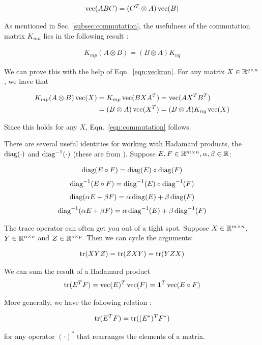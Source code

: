 \begin{align}
\operatorname{vec}(ABC) = (C^T \otimes A) \operatorname{vec}(B) \label{eqn:veckron}
\end{align}

As mentioned in Sec. \ref{subsec:commutation}, the usefulness of the commutation matrix $K_{mn}$ lies in the following result \cite{magnus1988matrix}:

\begin{align}
K_{mp} (A \otimes B) = (B \otimes A) K_{nq}  \label{eqn:commutation}
\end{align}

We can prove this with the help of Eqn.~\ref{eqn:veckron}. For any matrix $X \in \mathbb{R}^{q \times n}$, we have that

\begin{align*}
  K_{mp} (A \otimes B) \operatorname{vec}(X) &= K_{mp} \operatorname{vec}(B X A^T) = \operatorname{vec}(A X^T B^T) \\
                              &= (B \otimes A) \operatorname{vec}(X^T) = (B \otimes A) K_{nq}\operatorname{vec}(X)
\end{align*}

Since this holds for any $X$, Eqn.~\ref{eqn:commutation} follows. 

There are several useful identities for working with Hadamard products, the $\operatorname{diag}(\cdot)$ and $\operatorname{diag}^{-1}(\cdot)$ (these are from \cite{minka2000old}).  Suppose $E, F \in \mathbb{R}^{m \times n}, \alpha, \beta \in \mathbb{R}$:

\begin{align}
  \operatorname{diag}(E \circ F) = \operatorname{diag}(E) \circ \operatorname{diag} (F) \label{eqn:diagHadProd}
\end{align}
\begin{align}
  \operatorname{diag}^{-1}(E \circ F) = \operatorname{diag}^{-1}(E) \circ \operatorname{diag}^{-1}(F) \label{eqn:diagInvHadProd}
\end{align}
\begin{align}
  \operatorname{diag}(\alpha E + \beta F) = \alpha \operatorname{diag}(E) + \beta \operatorname{diag} (F) \label{eqn:diagLinear}
\end{align}
\begin{align}
  \operatorname{diag}^{-1}(\alpha E + \beta F) = \alpha \operatorname{diag}^{-1}(E) + \beta \operatorname{diag}^{-1}(F) \label{eqn:diagInvLinear}
\end{align}

The trace operator can often get you out of a tight spot.  Suppose $X \in \mathbb{R}^{m \times n}$, $Y \in \mathbb{R}^{n \times o}$ and $Z \in \mathbb{R}^{o\times p}$.  Then we can cycle the arguments:

\begin{align*}
  \operatorname{tr}(XYZ) = \operatorname{tr}(ZXY) = \operatorname{tr}(YZX)
\end{align*}

We can sum the result of a Hadamard product 
\begin{align*}
  \operatorname{tr}(E^TF) = \operatorname{vec}(E)^T\operatorname{vec}(F) = \mathbf{1}^T \operatorname{vec}(E \circ F)
\end{align*}

More generally, we have the following relation \cite{minka2000old}:

\begin{align}
  \operatorname{tr}(E^T F) = \operatorname{tr}((E^*)^T F^*)
\end{align}

for any operator $(\cdot)^*$ that rearranges the elements of a matrix.


